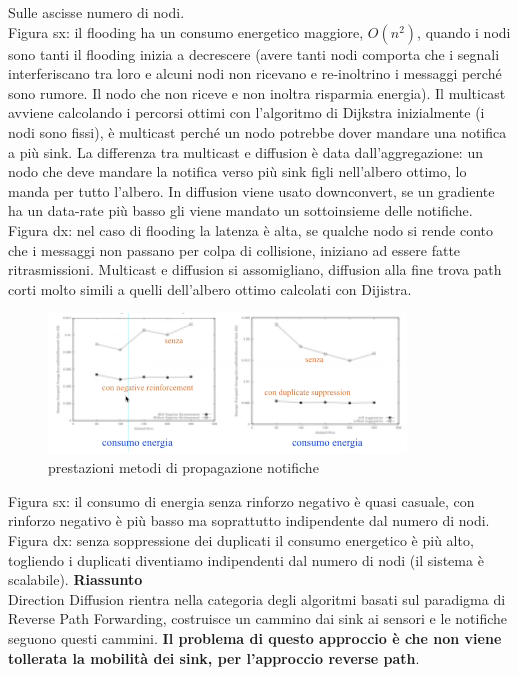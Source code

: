 \documentclass[12pt,italian]{report}
\begin{document}
Sulle ascisse numero di nodi. \\
Figura sx: il flooding ha un consumo energetico maggiore, $O(n^2)$, quando i nodi sono tanti il flooding inizia a decrescere (avere tanti nodi comporta che i segnali interferiscano tra loro e alcuni nodi non ricevano e re-inoltrino i messaggi perché sono rumore. Il nodo che non riceve e non inoltra risparmia energia). Il multicast avviene calcolando i percorsi ottimi con l'algoritmo di Dijkstra inizialmente (i nodi sono fissi), è multicast perché un nodo potrebbe dover mandare una notifica a più sink. La differenza tra multicast e diffusion è data dall'aggregazione: un nodo che deve mandare la notifica verso più sink figli nell'albero ottimo, lo manda per tutto l'albero. In diffusion viene usato downconvert, se un gradiente ha un data-rate più basso gli viene mandato un sottoinsieme delle notifiche.  \bigbreak
\noindent Figura dx: nel caso di flooding la latenza è alta, se qualche nodo si rende conto che i messaggi non passano per colpa di collisione, iniziano ad essere fatte ritrasmissioni. Multicast e diffusion si assomigliano, diffusion alla fine trova path corti molto simili a quelli dell'albero ottimo calcolati con Dijistra. 
\begin{figure}[h]
\centering
\includegraphics[width=95mm]{img/prestazion2.PNG}
\caption{prestazioni metodi di propagazione notifiche}
\label{fig:pres}
\end{figure}
\bigbreak
\noindent Figura sx: il consumo di energia senza rinforzo negativo è quasi casuale, con rinforzo negativo è più basso ma soprattutto indipendente dal numero di nodi. 
\bigbreak
\noindent Figura dx: senza soppressione dei duplicati il consumo energetico è più alto, togliendo i duplicati diventiamo indipendenti dal numero di nodi (il sistema è scalabile). 
\bigbreak
\noindent \textbf{Riassunto} \\
Direction Diffusion rientra nella categoria degli algoritmi basati sul paradigma di Reverse Path Forwarding, costruisce un cammino dai sink ai sensori e le notifiche seguono questi cammini. \textbf{Il problema di questo approccio è che non viene tollerata la mobilità dei sink, per l'approccio reverse path}. 
\end{document}
